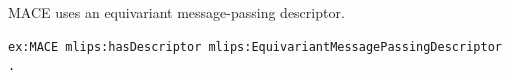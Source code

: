 MACE uses an equivariant message-passing descriptor.
\begin{lstlisting}[language=turtle]
ex:MACE mlips:hasDescriptor mlips:EquivariantMessagePassingDescriptor .
\end{lstlisting}
